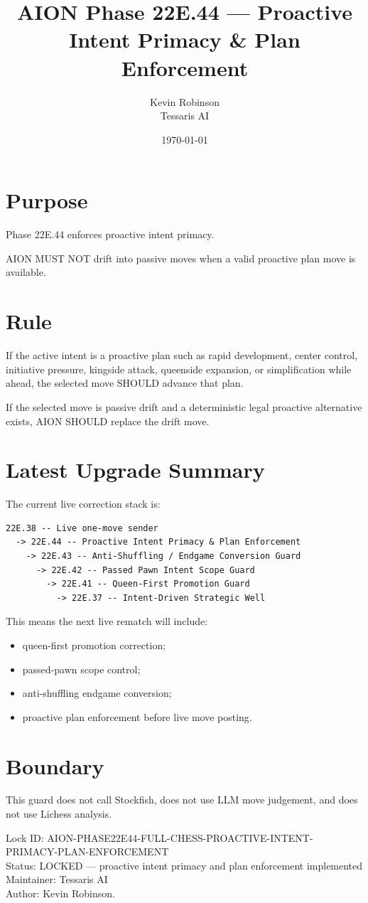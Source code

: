 \documentclass[11pt,a4paper]{article}
\title{\textbf{AION Phase 22E.44 --- Proactive Intent Primacy \& Plan Enforcement}}
\author{Kevin Robinson\\Tessaris AI}
\date{\today}
\begin{document}
\maketitle

\section{Purpose}

Phase 22E.44 enforces proactive intent primacy.

AION MUST NOT drift into passive moves when a valid proactive plan move is available.

\section{Rule}

If the active intent is a proactive plan such as rapid development, center control, initiative pressure, kingside attack, queenside expansion, or simplification while ahead, the selected move SHOULD advance that plan.

If the selected move is passive drift and a deterministic legal proactive alternative exists, AION SHOULD replace the drift move.

\section{Latest Upgrade Summary}

The current live correction stack is:

\begin{verbatim}
22E.38 -- Live one-move sender
  -> 22E.44 -- Proactive Intent Primacy & Plan Enforcement
    -> 22E.43 -- Anti-Shuffling / Endgame Conversion Guard
      -> 22E.42 -- Passed Pawn Intent Scope Guard
        -> 22E.41 -- Queen-First Promotion Guard
          -> 22E.37 -- Intent-Driven Strategic Well
\end{verbatim}

This means the next live rematch will include:

\begin{itemize}
  \item queen-first promotion correction;
  \item passed-pawn scope control;
  \item anti-shuffling endgame conversion;
  \item proactive plan enforcement before live move posting.
\end{itemize}

\section{Boundary}

This guard does not call Stockfish, does not use LLM move judgement, and does not use Lichess analysis.

\bigskip

\noindent
Lock ID: AION-PHASE22E44-FULL-CHESS-PROACTIVE-INTENT-PRIMACY-PLAN-ENFORCEMENT\\
Status: LOCKED --- proactive intent primacy and plan enforcement implemented\\
Maintainer: Tessaris AI\\
Author: Kevin Robinson.
\end{document}
